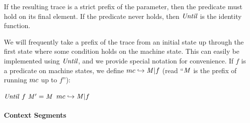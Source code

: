 \documentclass[10pt,conference]{ieeetran}%
\theoremstyle{definition}
\begin{document}
If the resulting trace is a strict prefix of the parameter, then the
predicate must hold on its final element. If the predicate never holds, then
\(\mathit{Until}\) is the identity function.

We will frequently take a prefix of the trace from an initial state up
through the first state where some condition holds on the machine state.
This can easily be implemented using \(\mathit{Until}\), and we provide special notation
for convenience.
%
If \(f\) is a predicate on machine states, we define \(mc
\hookrightarrow \mathit{M} | f\) (read ``\(\mathit{M}\) is the prefix of
running \(mc\) up to \(f\)''):
%
\begin{center}
            {\(\mathit{Until} ~ f ~ \mathit{M}' = \mathit{M}\)}
            {\(mc \hookrightarrow \mathit{M} | f\)}
\end{center}

\paragraph*{Context Segments}
\end{document}
